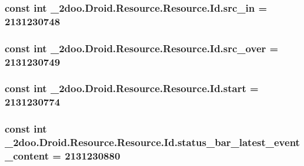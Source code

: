 \hypertarget{class__2doo_1_1_droid_1_1_resource_1_1_id_fe20314086e82567e02e66a0ffbcefa3}{
\subsubsection[{src\_\-in}]{\setlength{\rightskip}{0pt plus 5cm}const int \_\-2doo.Droid.Resource.Resource.Id.src\_\-in = 2131230748}}
\label{class__2doo_1_1_droid_1_1_resource_1_1_id_fe20314086e82567e02e66a0ffbcefa3}


\hypertarget{class__2doo_1_1_droid_1_1_resource_1_1_id_1397aab88a1845ab4d5fa7a40de1199b}{
\subsubsection[{src\_\-over}]{\setlength{\rightskip}{0pt plus 5cm}const int \_\-2doo.Droid.Resource.Resource.Id.src\_\-over = 2131230749}}
\label{class__2doo_1_1_droid_1_1_resource_1_1_id_1397aab88a1845ab4d5fa7a40de1199b}


\hypertarget{class__2doo_1_1_droid_1_1_resource_1_1_id_7c4035b58ac60d9d7d77b516f7bc48ef}{
\subsubsection[{start}]{\setlength{\rightskip}{0pt plus 5cm}const int \_\-2doo.Droid.Resource.Resource.Id.start = 2131230774}}
\label{class__2doo_1_1_droid_1_1_resource_1_1_id_7c4035b58ac60d9d7d77b516f7bc48ef}


\hypertarget{class__2doo_1_1_droid_1_1_resource_1_1_id_69d4e89e42da87cb4c417d8054f1caf5}{
\subsubsection[{status\_\-bar\_\-latest\_\-event\_\-content}]{\setlength{\rightskip}{0pt plus 5cm}const int \_\-2doo.Droid.Resource.Resource.Id.status\_\-bar\_\-latest\_\-event\_\-content = 2131230880}}
\label{class__2doo_1_1_droid_1_1_resource_1_1_id_69d4e89e42da87cb4c417d8054f1caf5}


